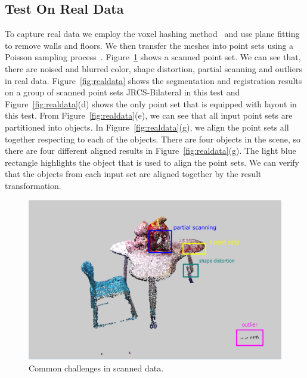 \subsection{Test On Real Data}
To capture real data we employ the voxel hashing method~\cite{VXH} and use plane fitting to remove walls and floors. 
%
We then transfer the meshes into point sets using a Poisson sampling process~\cite{PossionSampling}.
%
Figure~\ref{fig:challenge} shows a scanned point set. We can see that, there are noised and blurred color, shape distortion, partial scanning and outliers in real data.
%
Figure~\ref{fig:realdata} shows the segmentation and registration results on a group of scanned point sets  JRCS-Bilateral in this test and Figure~\ref{fig:realdata}(d) shows the only point set that is equipped with layout in this test.
From Figure~\ref{fig:realdata}(e), we can see that all input point sets are partitioned into objects. In Figure~\ref{fig:realdata}(g), we align the point sets all together respecting to each of the objects. There are four objects in the scene, so there are four different aligned results in Figure~\ref{fig:realdata}(g). The light blue rectangle highlights the object that is used to align the point sets. We can verify that the objects from each input set are aligned together by the result transformation.
\begin{figure}
	\centering
	\includegraphics[width=\linewidth]{images/challenge/challenge}
	\caption{\label{fig:challenge}Common challenges in scanned data.}
\end{figure}
